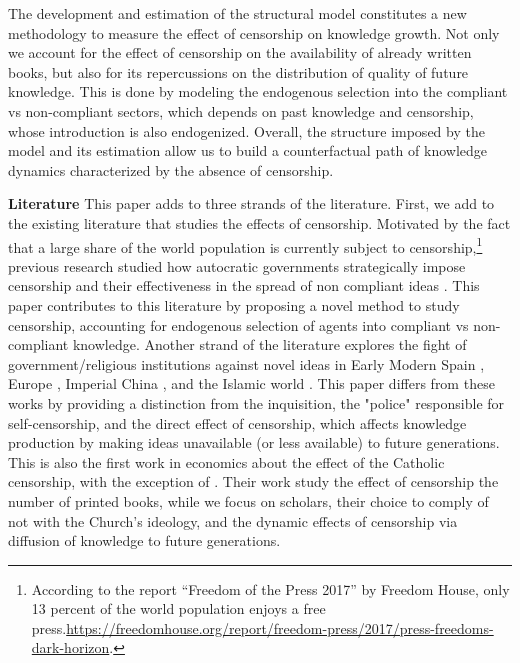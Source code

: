 \documentclass[12pt]{article}
\begin{document}
The development and estimation of the structural model constitutes a new methodology to measure the effect of censorship on knowledge growth. Not only we account for the effect of censorship on the availability of already written books, but also for its repercussions on the distribution of quality of future knowledge. This is done by
modeling the endogenous selection into the compliant vs non-compliant sectors, which depends on past knowledge and censorship, whose introduction is also endogenized. Overall, the structure imposed by the model and its estimation allow us to build a counterfactual path of knowledge dynamics characterized by the absence of censorship. 


\textbf{Literature} This paper adds to three strands of the literature. First, we add to the existing literature that studies the effects of censorship. Motivated by the fact that a large share of the world population is currently subject to censorship,\footnote{According to the report “Freedom of the Press 2017” by Freedom House, only 13 percent of the world population enjoys a free press.\href{https://freedomhouse.org/report/freedom-press/2017/press-freedoms-dark-horizon}{https://freedomhouse.org/report/freedom-press/2017/press-freedoms-dark-horizon}.}  previous research studied how autocratic governments strategically impose censorship \cite{king2013,zhuang2019} and their effectiveness in the spread of non compliant ideas \cite{roberts2014}. This paper contributes to this literature by proposing a novel method to study censorship, accounting for endogenous selection of agents into compliant vs non-compliant knowledge. Another strand of the literature explores the fight of government/religious institutions against novel ideas in Early Modern Spain \cite{vidal2011}, Europe \cite{anderson2015}, Imperial China \cite{koyama2015}, and the Islamic world \cite{chaney2016}. This paper differs from these works by providing a distinction from the inquisition, the "police" responsible for self-censorship, and the direct effect of censorship, which affects knowledge production by making ideas unavailable (or less available) to future generations. This is also the first work in economics about the effect of the Catholic censorship, with the exception of . Their work study the effect of censorship the number of printed books, while we focus on scholars, their choice to comply of not with the Church's ideology, and the dynamic effects of censorship via diffusion of knowledge to future generations.
\end{document}
